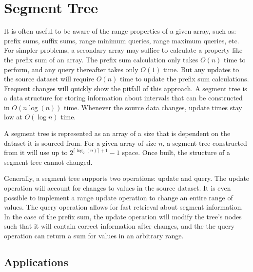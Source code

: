 \section{Segment Tree}


It is often useful to be aware of the range properties of a given array, such as: prefix sums, suffix sums, range minimum queries, range maximum queries, etc.
For simpler problems, a secondary array may suffice to calculate a property like the prefix sum of an array.
The prefix sum calculation only takes $O(n)$ time to perform, and any query thereafter takes only $O(1)$ time.
But any updates to the source dataset will require $O(n)$ time to update the prefix sum calculations.
Frequent changes will quickly show the pitfall of this approach.
A segment tree is a data structure for storing information about intervals that can be constructed in $O(n \log(n))$ time.
Whenever the source data changes, update times stay low at $O(\log n)$ time.


A segment tree is represented as an array of a size that is dependent on the dataset it is sourced from.
For a given array of size $n$, a segment tree constructed from it will use up to $2^{\lceil \log_2 (n)\rceil + 1} - 1$ space.
Once built, the structure of a segment tree cannot changed.






Generally, a segment tree supports two operations: update and query.
The update operation will account for changes to values in the source dataset.
It is even possible to implement a range update operation to change an entire range of values.
The query operation allows for fast retrieval about segment information.
In the case of the prefix sum, the update operation will modify the tree's nodes such that it will contain correct information after changes, and the the query operation can return a sum for values in an arbitrary range.

\subsection{Applications}

